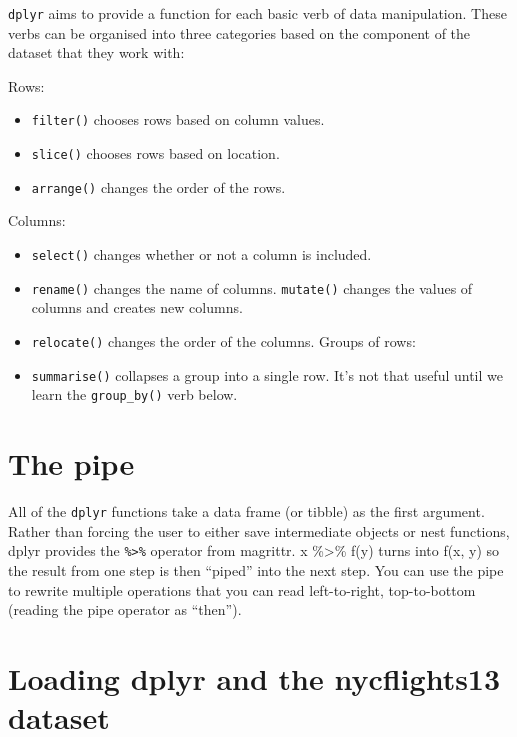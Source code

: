 \documentclass[
]{book}
\providecommand{\tightlist}{%
  \setlength{\itemsep}{0pt}\setlength{\parskip}{0pt}}
\begin{document}
\texttt{dplyr} aims to provide a function for each basic verb of data manipulation. These verbs can be organised into three categories based on the component of the dataset that they work with:

Rows:

\begin{itemize}
\tightlist
\item
  \texttt{filter()} chooses rows based on column values.
\item
  \texttt{slice()} chooses rows based on location.
\item
  \texttt{arrange()} changes the order of the rows.
\end{itemize}

Columns:

\begin{itemize}
\tightlist
\item
  \texttt{select()} changes whether or not a column is included.
\item
  \texttt{rename()} changes the name of columns.
  \texttt{mutate()} changes the values of columns and creates new columns.
\item
  \texttt{relocate()} changes the order of the columns.
  Groups of rows:
\item
  \texttt{summarise()} collapses a group into a single row. It's not that useful until we learn the \texttt{group\_by()} verb below.
\end{itemize}

\hypertarget{the-pipe}{%
\section{The pipe}\label{the-pipe}}

All of the \texttt{dplyr} functions take a data frame (or tibble) as the first argument. Rather than forcing the user to either save intermediate objects or nest functions, dplyr provides the \texttt{\%\textgreater{}\%} operator from magrittr. x \%\textgreater\% f(y) turns into f(x, y) so the result from one step is then ``piped'' into the next step. You can use the pipe to rewrite multiple operations that you can read left-to-right, top-to-bottom (reading the pipe operator as ``then'').

\hypertarget{loading-dplyr-and-the-nycflights13-dataset}{%
\section{Loading dplyr and the nycflights13 dataset}\label{loading-dplyr-and-the-nycflights13-dataset}}
\end{document}
